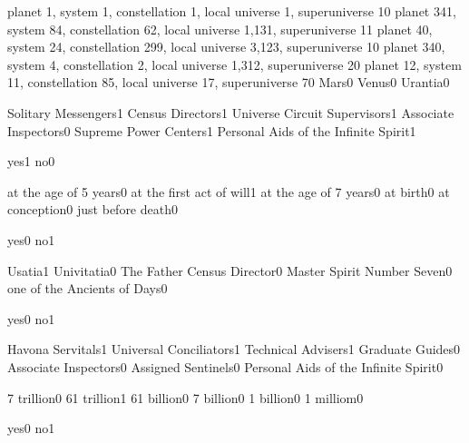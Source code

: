 {planet 1, system 1, constellation 1, local universe 1, superuniverse 1}{0}
{planet 341, system 84, constellation 62, local universe 1,131, superuniverse 1}{1}
{planet 40, system 24, constellation 299, local universe 3,123, superuniverse 1}{0}
{planet 340, system 4, constellation 2, local universe 1,312, superuniverse 2}{0}
{planet 12, system 11, constellation 85, local universe 17, superuniverse 7}{0}
{Mars}{0}
{Venus}{0}
{Urantia}{0}
\qstop

{Solitary Messengers}{1}
{Census Directors}{1}
{Universe Circuit Supervisors}{1}
{Associate Inspectors}{0}
{Supreme Power Centers}{1}
{Personal Aids of the Infinite Spirit}{1}
\qstop

{yes}{1}
{no}{0}
\qstop

{at the age of 5 years}{0}
{at the first act of will}{1}
{at the age of 7 years}{0}
{at birth}{0}
{at conception}{0}
{just before death}{0}
\qstop

{yes}{0}
{no}{1}
\qstop

{Usatia}{1}
{Univitatia}{0}
{The Father Census Director}{0}
{Master Spirit Number Seven}{0}
{one of the Ancients of Days}{0}
\qstop

{yes}{0}
{no}{1}
\qstop


{Havona Servitals}{1}
{Universal Conciliators}{1}
{Technical Advisers}{1}
{Graduate Guides}{0}
{Associate Inspectors}{0}
{Assigned Sentinels}{0}
{Personal Aids of the Infinite Spirit}{0}
\qstop

{7 trillion}{0}
{61 trillion}{1}
{61 billion}{0}
{7 billion}{0}
{1 billion}{0}
{1 milliom}{0}
\qstop

{yes}{0}
{no}{1}
\qstop


